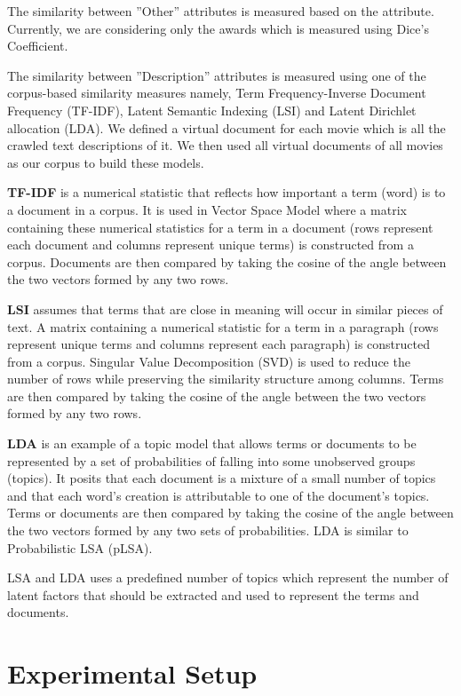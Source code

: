 \documentclass{sigish}
\begin{document}
The similarity between ''Other'' attributes is measured based on the attribute. Currently, we are considering only the awards which is measured using Dice's Coefficient.

The similarity between ''Description'' attributes is measured using one of the corpus-based similarity measures namely, Term Frequency-Inverse Document Frequency (TF-IDF), Latent Semantic Indexing (LSI) and Latent Dirichlet allocation (LDA). We defined a virtual document for each movie which is all the crawled text descriptions of it. We then used all virtual documents of all movies as our corpus to build these models.

\textbf{TF-IDF} is a numerical statistic that reflects how important a term (word) is to a document in a corpus. It is used in Vector Space Model where a matrix containing these numerical statistics for a term in a document (rows represent each document and columns represent unique terms) is constructed from a corpus. Documents are then compared by taking the cosine of the angle between the two vectors formed by any two rows.

\textbf{LSI} assumes that terms that are close in meaning will occur in similar pieces of text. A matrix containing a numerical statistic for a term in a paragraph (rows represent unique terms and columns represent each paragraph) is constructed from a corpus. Singular Value Decomposition (SVD) is used to reduce the number of rows while preserving the similarity structure among columns. Terms are then compared by taking the cosine of the angle between the two vectors formed by any two rows.

\textbf{LDA} is an example of a topic model that allows terms or documents to be represented by a set of probabilities of falling into some unobserved groups (topics). It posits that each document is a mixture of a small number of topics and that each word's creation is attributable to one of the document's topics. Terms or documents are then compared by taking the cosine of the angle between the two vectors formed by any two sets of probabilities. LDA is similar to Probabilistic LSA (pLSA).

LSA and LDA uses a predefined number of topics which represent the number of latent factors that should be extracted and used to represent the terms and documents.

\section{Experimental Setup}
\end{document}
